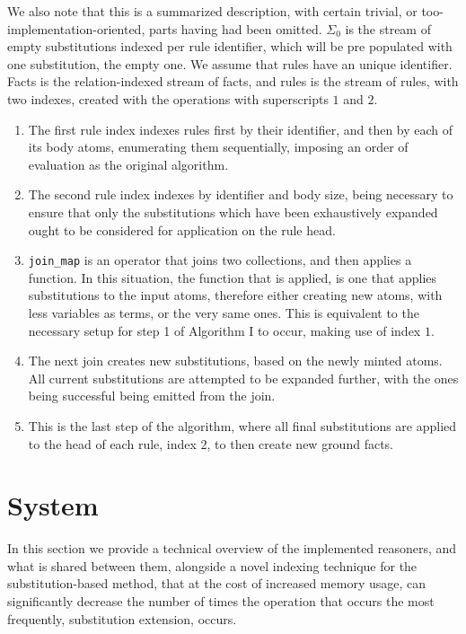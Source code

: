 \documentclass[sigconf,screen,review,natbib]{acmart}
\theoremstyle{definition}
\begin{document}
We also note that this is a summarized description, with certain trivial, or too-implementation-oriented, parts
having had been omitted. $\Sigma_0$ is the stream of empty substitutions indexed per rule identifier, which will
be pre populated with one substitution, the empty one. We assume that rules have an unique identifier. Facts is
the relation-indexed stream of facts, and rules is the stream of rules, with two indexes, created with the operations
with superscripts $1$ and $2$.
\begin{enumerate}
	\item The first rule index indexes rules first by their identifier, and then by each of its body atoms, enumerating
	      them sequentially, imposing an order of evaluation as the original algorithm.
	\item The second rule index indexes by identifier and body size, being necessary to ensure that only the substitutions
	      which have been exhaustively expanded ought to be considered for application on the rule head.
	\item \verb|join_map| is an operator that joins two collections, and then applies a function. In this situation, the
	      function that is applied, is one that applies substitutions to the input atoms, therefore either creating new
	      atoms, with less variables as terms, or the very same ones. This is equivalent to the necessary setup for step 1
	      of Algorithm I to occur, making use of index $1$.
	\item The next join creates new substitutions, based on the newly minted atoms. All current substitutions are attempted
	      to be expanded further, with the ones being successful being emitted from the join.
	\item This is the last step of the algorithm, where all final substitutions are applied to the head of each rule, index
	      $2$, to then create new ground facts.
\end{enumerate}
\section{System}
In this section we provide a technical overview of the implemented reasoners, and what is shared between them, alongside
a novel indexing technique for the substitution-based method, that at the cost of increased memory usage, can significantly
decrease the number of times the operation that occurs the most frequently, substitution extension, occurs.
\end{document}

